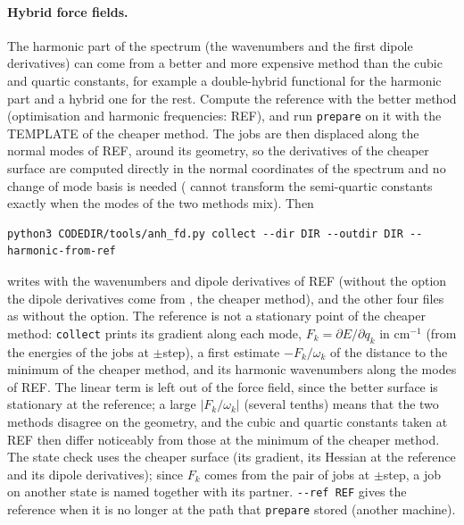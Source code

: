 \paragraph{Hybrid force fields.} The harmonic part of the spectrum (the
wavenumbers and the first dipole derivatives) can come from a better and
more expensive method than the cubic and quartic constants, for example a
double-hybrid functional for the harmonic part and a hybrid one for the
rest. Compute the reference with the better method (optimisation and
harmonic frequencies: REF), and run \texttt{prepare} on it with the
TEMPLATE of the cheaper method. The jobs are then displaced along the
normal modes of REF, around its geometry, so the derivatives of the
cheaper surface are computed directly in the normal coordinates of the
spectrum and no change of mode basis is needed ( cannot transform the semi-quartic constants exactly when the
modes of the two methods mix). Then
\begin{lstlisting}
python3 CODEDIR/tools/anh_fd.py collect --dir DIR --outdir DIR --harmonic-from-ref
\end{lstlisting}
writes  with the wavenumbers and dipole derivatives of
REF (without the option the dipole derivatives come from , the
cheaper method), and the other four files as without the option. The
reference is not a stationary point of the cheaper method: \texttt{collect}
prints its gradient along each mode, $F_k=\partial E/\partial q_k$ in
cm$^{-1}$ (from the energies of the jobs at $\pm$step), a first estimate
$-F_k/\omega_k$ of the distance to the minimum of the cheaper method, and
its harmonic wavenumbers along the modes of REF. The linear term is left
out of the force field, since the better surface is stationary at the
reference; a large $|F_k/\omega_k|$ (several tenths) means that the two
methods disagree on the geometry, and the cubic and quartic constants
taken at REF then differ noticeably from those at the minimum of the
cheaper method. The state check uses the cheaper surface (its gradient,
its Hessian at the reference and its dipole derivatives); since $F_k$
comes from the pair of jobs at $\pm$step, a job on another state is
named together with its partner. \texttt{-{}-ref REF} gives the reference
when it is no longer at the path that \texttt{prepare} stored (another
machine).

\section{}\label{sec:run-ffcompare}

